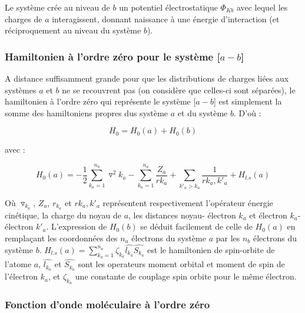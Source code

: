 Le système crée au niveau de $b$ un potentiel électrostatique $\Phi_{Kb}$ avec lequel les charges de $a$ interagissent, donnant naissance à une énergie d'interaction (et réciproquement au niveau du système $b$).

\subsubsection{Hamiltonien à l'ordre zéro pour le système [$a-b$]}

A distance suffisamment grande pour que les distributions de charges liées aux systèmes $a$ et $b$ ne se recouvrent pas (on considère que celles-ci sont séparées), le hamiltonien à l'ordre zéro qui représente le système [$a-b$] est simplement la somme des hamiltoniens propres dus système $a$ et du système $b$. D'où : 

\begin{equation}
H_{0} = H_{0}(a) + H_{0}(b) \label{1.2}
\end{equation}

avec : 

\begin{equation}
H_{0}(a) = -\frac{1}{2} \sum_{k_{a}=1}^{n_{a}} \triangledown^{2} k_{a} - \sum_{k_{a}=1}^{n_{a}} \frac{Z_{a}}{rk_{a}} + \sum_{k'_{a}>k_{a}} \frac{1}{rk_{a},k'_{a}} + H_{l.s}(a)  \label{1.3}
\end{equation}

Où $\triangledown_{k_{a}}$, $Z_{a}$, $r_{k_{a}}$ et $rk_{a},k'_{a}$ représentent respectivement l'opérateur énergie cinétique, la charge du noyau de $a$, les distances noyau- électron $k_{a}$ et électron $k_{a}$- électron $k'_{a}$. L'expression de $H_{0}(b)$ se déduit facilement de celle de $H_{0}(a)$ en remplaçant les coordonnées des $n_{a}$ électrons du système $a$ par les $n_{b}$ électrons du système $b$. $H_{l.s}(a)= \sum_{k_{a}=1}^{n_{a}} \zeta_{k_{a}} \widehat{l_{k_{a}}} \widehat{S_{k_{a}}}$ est le hamiltonien de spin-orbite de l'atome $a$, $\widehat{l_{k_{a}}}$ et $\widehat{S_{k_{a}}}$ sont les operateurs moment orbital et moment de spin de l'électron $k_{a}$, et $\zeta_{k_{a}}$ une constante de couplage spin orbite pour le même électron.


\subsubsection{Fonction d'onde moléculaire à l'ordre zéro}

